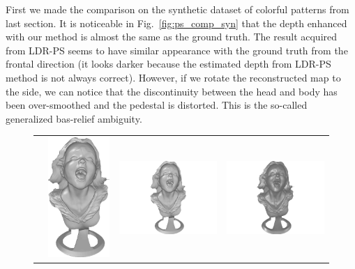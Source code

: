First we made the comparison on the synthetic dataset of colorful patterns from last section.
It is noticeable in Fig.~\ref{fig:ps_comp_syn} that the depth enhanced with our method is almost the same as the ground truth.
The result acquired from LDR-PS seems to have similar appearance with the ground truth from the frontal direction (it looks darker because the estimated depth from LDR-PS method is not always correct).
However, if we rotate the reconstructed map to the side, we can notice that the discontinuity between the head and body has been over-smoothed and the pedestal is distorted.
This is the so-called generalized bas-relief ambiguity.

\begin{figure}[!ht]
\centering
\setlength{\tabcolsep}{0.1em} %
 {\renewcommand{\arraystretch}{1.6}%
\begin{tabular}{c c c c}
   \multirow{-6}{*}{\parbox[t]{2.5mm}{}} &    
   \includegraphics[height = 0.24\linewidth]{figures/result/comp_gt_shape.pdf} 
   &
   \includegraphics[height = 0.24\linewidth]{figures/result/ps2_robust_front.pdf} &
   \includegraphics[height = 0.24\linewidth]{figures/result/ps2_LDR_front.pdf} \\


\end{tabular}}
\end{figure}

